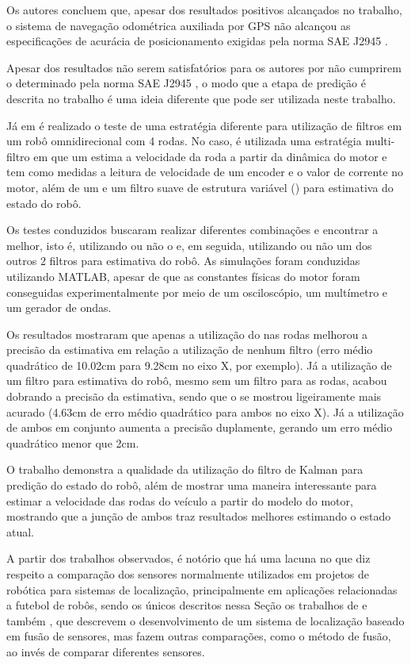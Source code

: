 \documentclass[acronym, symbols, table]{fei}
\begin{document}
Os autores concluem que, apesar dos resultados positivos alcançados no trabalho, o sistema de navegação odométrica auxiliada por GPS não alcançou as especificações de acurácia de posicionamento exigidas pela norma SAE J2945 \cite{sae2016board}.

Apesar dos resultados não serem satisfatórios para os autores por não cumprirem o determinado pela norma SAE J2945 \cite{sae2016board}, o modo que a etapa de predição é descrita no trabalho é uma ideia diferente que pode ser utilizada neste trabalho.

Já em \textcite{9233826} é realizado o teste de uma estratégia diferente para utilização de filtros em um robô omnidirecional com 4 rodas. No caso, é utilizada uma estratégia multi-filtro em que um  estima a velocidade da roda a partir da dinâmica do motor e tem como medidas a leitura de velocidade de um encoder e o valor de corrente no motor, além de um  e um filtro suave de estrutura variável () para estimativa do estado do robô.

Os testes conduzidos buscaram realizar diferentes combinações e encontrar a melhor, isto é, utilizando ou não o  e, em seguida, utilizando ou não um dos outros 2 filtros para estimativa do robô. As simulações foram conduzidas utilizando MATLAB, apesar de que as constantes físicas do motor foram conseguidas experimentalmente por meio de um osciloscópio, um multímetro e um gerador de ondas.

Os resultados mostraram que apenas a utilização do  nas rodas melhorou a precisão da estimativa em relação a utilização de nenhum filtro (erro médio quadrático de 10.02cm para 9.28cm no eixo X, por exemplo). Já a utilização de um filtro para estimativa do robô, mesmo sem um filtro para as rodas, acabou dobrando a precisão da estimativa, sendo que o  se mostrou ligeiramente mais acurado (4.63cm de erro médio quadrático para ambos no eixo X). Já a utilização de ambos em conjunto aumenta a precisão duplamente, gerando um erro médio quadrático menor que 2cm.

O trabalho demonstra a qualidade da utilização do filtro de Kalman para predição do estado do robô, além de mostrar uma maneira interessante para estimar a velocidade das rodas do veículo a partir do modelo do motor, mostrando que a junção de ambos traz resultados melhores estimando o estado atual.

A partir dos trabalhos observados, é notório que há uma lacuna no que diz respeito a comparação dos sensores normalmente utilizados em projetos de robótica para sistemas de localização, principalmente em aplicações relacionadas a futebol de robôs, sendo os únicos descritos nessa Seção os trabalhos de \textcite{aguiar2017kalman} e também \cite{ismail2022soccer}, que descrevem o desenvolvimento de um sistema de localização baseado em fusão de sensores, mas fazem outras comparações, como o método de fusão, ao invés de comparar diferentes sensores.
\end{document}
